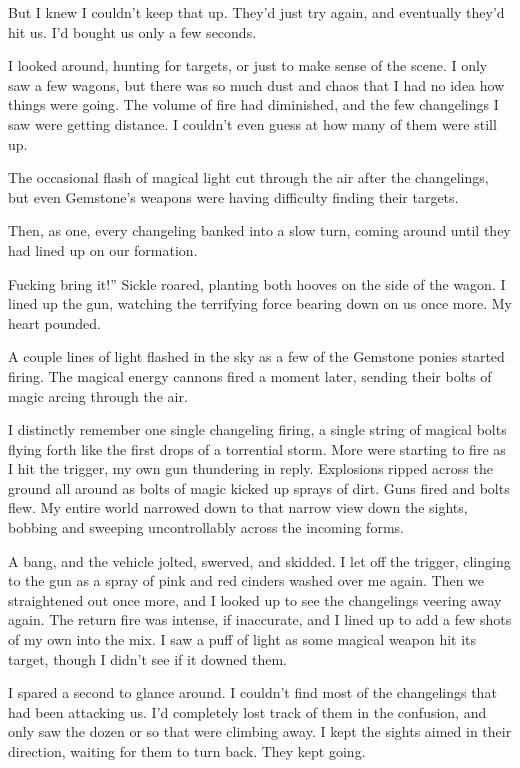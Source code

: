 But I knew I couldn’t keep that up. They’d just try again, and eventually they’d hit us. I’d bought us only a few seconds.

I looked around, hunting for targets, or just to make sense of the scene. I only saw a few wagons, but there was so much dust and chaos that I had no idea how things were going. The volume of fire had diminished, and the few changelings I saw were getting distance. I couldn’t even guess at how many of them were still up.

The occasional flash of magical light cut through the air after the changelings, but even Gemstone’s weapons were having difficulty finding their targets.

Then, as one, every changeling banked into a slow turn, coming around until they had lined up on our formation.

\leavevmode{}Fucking bring it!” Sickle roared, planting both hooves on the side of the wagon. I lined up the gun, watching the terrifying force bearing down on us once more. My heart pounded.

A couple lines of light flashed in the sky as a few of the Gemstone ponies started firing. The magical energy cannons fired a moment later, sending their bolts of magic arcing through the air.

I distinctly remember one single changeling firing, a single string of magical bolts flying forth like the first drops of a torrential storm. More were starting to fire as I hit the trigger, my own gun thundering in reply. Explosions ripped across the ground all around as bolts of magic kicked up sprays of dirt. Guns fired and bolts flew. My entire world narrowed down to that narrow view down the sights, bobbing and sweeping uncontrollably across the incoming forms.

A bang, and the vehicle jolted, swerved, and skidded. I let off the trigger, clinging to the gun as a spray of pink and red cinders washed over me again. Then we straightened out once more, and I looked up to see the changelings veering away again. The return fire was intense, if inaccurate, and I lined up to add a few shots of my own into the mix. I saw a puff of light as some magical weapon hit its target, though I didn’t see if it downed them.

I spared a second to glance around. I couldn’t find most of the changelings that had been attacking us. I’d completely lost track of them in the confusion, and only saw the dozen or so that were climbing away. I kept the sights aimed in their direction, waiting for them to turn back. They kept going.

